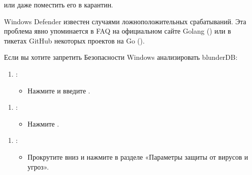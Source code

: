 \documentclass[letterpaper,10pt,russian]{sphinxmanual}
\begin{document}
\begin{figure}[htbp]
\centering

\noindent{}
\end{figure}

\sphinxAtStartPar
или даже поместить его в карантин.

\sphinxAtStartPar
Windows Defender известен случаями ложноположительных срабатываний. Эта проблема явно упоминается в FAQ на официальном сайте Golang () или в тикетах GitHub некоторых проектов на Go ().

\sphinxAtStartPar
Если вы хотите запретить Безопасности Windows анализировать blunderDB:
\begin{enumerate}
%
\item {} 
\sphinxAtStartPar
{}:
\begin{itemize}
\item {} 
\sphinxAtStartPar
Нажмите  и введите .

\end{itemize}

\end{enumerate}

\begin{figure}[htbp]
\centering

\noindent{}
\end{figure}
\begin{enumerate}
%
\setcounter{enumi}{1}
\item {} 
\sphinxAtStartPar
{}:
\begin{itemize}
\item {} 
\sphinxAtStartPar
Нажмите .

\end{itemize}

\end{enumerate}

\begin{figure}[htbp]
\centering

\noindent{}
\end{figure}
\begin{enumerate}
%
\setcounter{enumi}{2}
\item {} 
\sphinxAtStartPar
{}:
\begin{itemize}
\item {} 
\sphinxAtStartPar
Прокрутите вниз и нажмите  в разделе «Параметры защиты от вирусов и угроз».

\end{itemize}

\end{enumerate}
\end{document}
